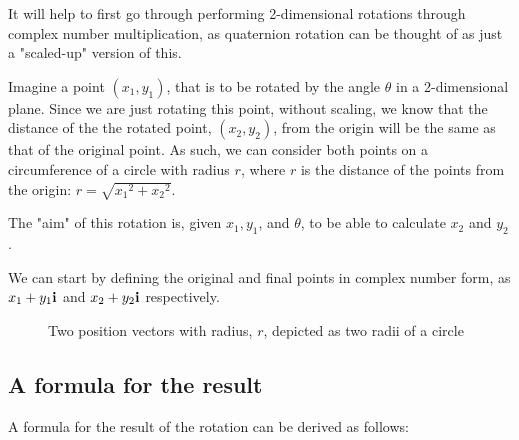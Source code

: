 \documentclass[11pt]{article}
\begin{document}
It will help to first go through performing 2-dimensional rotations through complex number multiplication, as quaternion rotation can be thought of as just a "scaled-up" version of this.

Imagine a point $(x_1, y_1)$, that is to be rotated by the angle $\theta$ in a 2-dimensional plane. Since we are just rotating this point, without scaling, we know that the distance of the the rotated point, $(x_2, y_2)$, from the origin will be the same as that of the original point. As such, we can consider both points on a circumference of a circle with radius $r$, where $r$ is the distance of the points from the origin: $r = \sqrt{{x_1}^2 + {x_2}^2}$.

The "aim" of this rotation is, given $x_1, y_1$, and $\theta$, to be able to calculate $x_2$ and $y_2$.

We can start by defining the original and final points in complex number form, as $x_1 + y_1\vb{i}$ and $x_2 + y_2\vb{i}$ respectively.

\cite{ComplexRotation}

\begin{figure}[H]
    \centering
    \caption{Two position vectors with radius, $r$, depicted as two radii of a circle}
\end{figure}

\subsection{A formula for the result}

A formula for the result of the rotation can be derived as follows:

\pagebreak

\printbibliography
\end{document}
